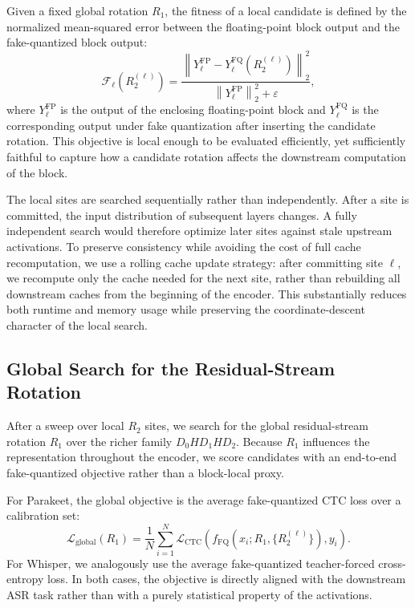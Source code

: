 \documentclass[11pt]{article}
\begin{document}
Given a fixed global rotation $R_1$, the fitness of a local candidate is defined by the normalized mean-squared error between the floating-point block output and the fake-quantized block output:
\begin{equation}
\mathcal{F}_\ell(R_2^{(\ell)}) =
\frac{\left\|Y_\ell^{\mathrm{FP}} - Y_\ell^{\mathrm{FQ}}(R_2^{(\ell)})\right\|_2^2}
{\left\|Y_\ell^{\mathrm{FP}}\right\|_2^2 + \varepsilon},
\end{equation}
where $Y_\ell^{\mathrm{FP}}$ is the output of the enclosing floating-point block and $Y_\ell^{\mathrm{FQ}}$ is the corresponding output under fake quantization after inserting the candidate rotation. This objective is local enough to be evaluated efficiently, yet sufficiently faithful to capture how a candidate rotation affects the downstream computation of the block.

The local sites are searched sequentially rather than independently. After a site is committed, the input distribution of subsequent layers changes. A fully independent search would therefore optimize later sites against stale upstream activations. To preserve consistency while avoiding the cost of full cache recomputation, we use a rolling cache update strategy: after committing site $\ell$, we recompute only the cache needed for the next site, rather than rebuilding all downstream caches from the beginning of the encoder. This substantially reduces both runtime and memory usage while preserving the coordinate-descent character of the local search.

\subsection{Global Search for the Residual-Stream Rotation}
After a sweep over local $R_2$ sites, we search for the global residual-stream rotation $R_1$ over the richer family $D_0 H D_1 H D_2$. Because $R_1$ influences the representation throughout the encoder, we score candidates with an end-to-end fake-quantized objective rather than a block-local proxy.

For Parakeet, the global objective is the average fake-quantized CTC loss over a calibration set:
\begin{equation}
\mathcal{L}_{\mathrm{global}}(R_1)
=
\frac{1}{N}
\sum_{i=1}^{N}
\mathcal{L}_{\mathrm{CTC}}
\left(
f_{\mathrm{FQ}}(x_i; R_1, \{R_2^{(\ell)}\})
,
y_i
\right).
\end{equation}
For Whisper, we analogously use the average fake-quantized teacher-forced cross-entropy loss. In both cases, the objective is directly aligned with the downstream ASR task rather than with a purely statistical property of the activations.
\end{document}
